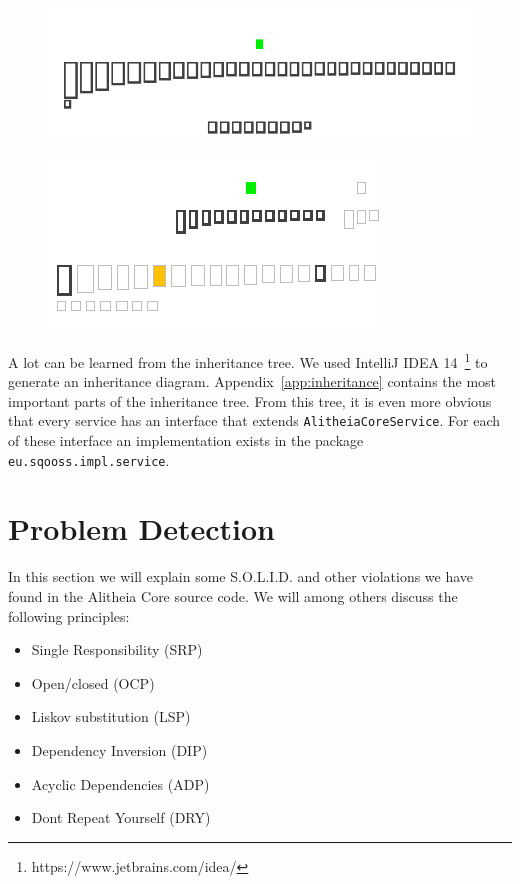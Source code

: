 \documentclass{article}
\begin{document}
\begin{figure}[h]
\centering
\begin{minipage}{.45\textwidth}
  \centering
  \includegraphics[width=0.9\linewidth]{daoobject-inheritance}
  \label{fig:daobject}
\end{minipage}\hspace{5mm}%
\begin{minipage}{.45\textwidth}
  \centering
  \includegraphics[width=0.9\linewidth]{alitheiacoreservice-inheritance}
  \label{fig:alitheiacoreservice}
\end{minipage}
\end{figure}

A lot can be learned from the inheritance tree. We used IntelliJ IDEA 14~\footnote{https://www.jetbrains.com/idea/} to generate an inheritance diagram. Appendix~\ref{app:inheritance} contains the most important parts of the inheritance tree. From this tree, it is even more obvious that every service has an interface that extends \verb|AlitheiaCoreService|. For each of these interface an implementation exists in the package \verb|eu.sqooss.impl.service|. %

\section{Problem Detection}
In this section we will explain some S.O.L.I.D. and other violations we have found in the Alitheia Core source code. We will among others discuss the following principles:
\begin{itemize}
  \item Single Responsibility (SRP)
  \item Open/closed (OCP)
  \item Liskov substitution (LSP)
  \item Dependency Inversion (DIP)
  \item Acyclic Dependencies (ADP)
  \item Dont Repeat Yourself (DRY)
\end{itemize} 
\end{document}
